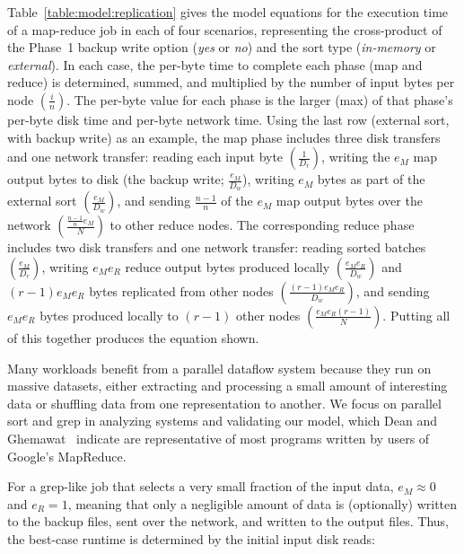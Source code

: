 Table~\ref{table:model:replication} gives the
model equations for the execution time of a map-reduce job
in each of four scenarios, representing the cross-product of the
Phase~1 backup write option ({\it yes} or {\it no}) and the sort type
({\it in-memory} or {\it external}).
In each case, the per-byte time to complete each phase (map and reduce)
is determined, summed, and multiplied by the number of input bytes per
node $\left(\frac{i}{n}\right)$.
The per-byte value for each phase is the larger (max) of that phase's
per-byte disk time and per-byte network time.
Using the last row (external sort, with backup write) as an example,
the map phase includes three disk transfers and one network transfer:
reading each input byte $\left(\frac{1}{D_r}\right)$, writing the $e_M$ map output
bytes to disk (the backup write; $\frac{e_M}{D_w}$),
writing $e_M$ bytes as part of the external sort $\left(\frac{e_M}{D_w}\right)$,
and sending $\frac{n-1}{n}$ of the $e_M$ map output bytes over the
network $\left(\frac{\frac{n-1}{n} e_M}{N}\right)$ to other reduce nodes.
The corresponding reduce phase includes two disk transfers and one
network transfer: reading sorted batches $\left(\frac{e_M}{D_r}\right)$,
writing $e_M e_R$ reduce output bytes produced locally $\left(\frac{e_M e_R}{D_w}\right)$
and $(r-1) e_M e_R$ bytes replicated from other nodes $\left(\frac{(r-1) e_M e_R}{D_w}\right)$,
and sending $e_M e_R$ bytes produced locally to $(r-1)$ other nodes
$\left(\frac{e_M e_R \left(r - 1\right)}{N}\right)$.
Putting all of this together produces the equation shown.


%


Many workloads benefit from a parallel dataflow system because they run
on massive datasets, either extracting and processing a small amount of
interesting data or shuffling data from one representation to another.
We focus on parallel sort and grep in analyzing systems and validating
our model, which Dean and Ghemawat~\cite{mapreduce} indicate
are representative of most programs written by users of Google's
MapReduce.

For a grep-like job that selects a very small
fraction of the input data, $e_M \approx 0$ and $e_R = 1$, meaning
that only a negligible amount of data is (optionally) written to the
backup files, sent over the network, and written to the output files.
Thus, the best-case runtime is determined by the initial input disk
reads:

